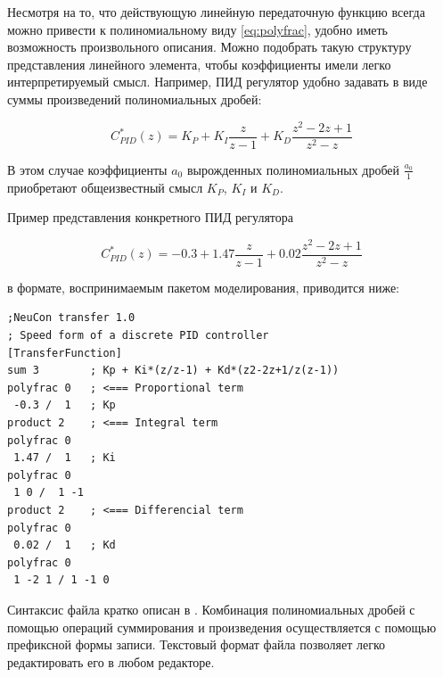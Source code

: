 Несмотря на то, что действующую линейную передаточную функцию всегда
можно привести к полиномиальному виду \ref{eq:polyfrac}, удобно иметь
возможность произвольного описания.  Можно подобрать такую структуру
представления линейного элемента, чтобы коэффициенты имели легко
интерпретируемый смысл.  Например, ПИД регулятор удобно задавать в
виде суммы произведений полиномиальных дробей:

\begin{equation}\label{eq:pid}
C_{PID}^*(z)=K_P+K_I\frac{z}{z-1}+K_D\frac{z^2-2z+1}{z^2-z}
\end{equation}

В этом случае коэффициенты $a_0$ вырожденных полиномиальных дробей
$\frac{a_0}{1}$ приобретают общеизвестный смысл $K_P$, $K_I$ и $K_D$.

Пример представления конкретного ПИД регулятора

\begin{equation}\label{eq:pid_example}
C_{PID}^*(z)=-0.3+1.47\frac{z}{z-1}+0.02\frac{z^2-2z+1}{z^2-z}
\end{equation}

\noindent в формате, воспринимаемым пакетом моделирования, приводится ниже:

\begin{verbatim}
;NeuCon transfer 1.0
; Speed form of a discrete PID controller
[TransferFunction]
sum 3		 ; Kp + Ki*(z/z-1) + Kd*(z2-2z+1/z(z-1))
polyfrac 0	 ; <=== Proportional term
 -0.3 /  1	 ; Kp
product 2	 ; <=== Integral term
polyfrac 0
 1.47 /  1	 ; Ki
polyfrac 0
 1 0 /  1 -1
product 2	 ; <=== Differencial term
polyfrac 0
 0.02 /  1	 ; Kd
polyfrac 0
 1 -2 1 / 1 -1 0
\end{verbatim}

Синтаксис файла кратко описан в .  Комбинация
полиномиальных дробей с помощью операций суммирования и произведения
осуществляется с помощью префиксной формы записи.  Текстовый формат
файла позволяет легко редактировать его в любом редакторе.

